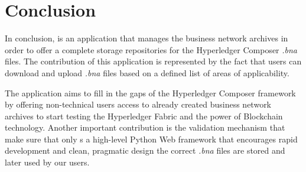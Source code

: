 \chapter{Conclusion}
\label{chapter:conclusion}
In conclusion, \textbf{\project} is an application that manages the business network archives in order to offer a complete storage repositories for the Hyperledger Composer \emph{.bna} files.
The contribution of this application is represented by the fact that users can download and upload \emph{.bna} files based on a defined list of areas of applicability.

The application aims to fill in the gaps of the Hyperledger Composer framework by offering non-technical users access to already created business network archives to start testing the Hyperledger Fabric and the power of Blockchain technology.
Another important contribution is the validation mechanism that make sure that only s a high-level Python Web framework that encourages rapid development and clean, pragmatic design the correct \emph{.bna} files are stored and later used by our users.